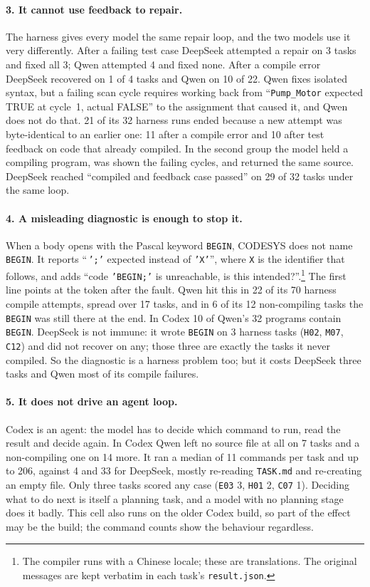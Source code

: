 \paragraph{3. It cannot use feedback to repair.}
The harness gives every model the same repair loop, and the two models use it
very differently. After a failing test case DeepSeek attempted a repair on 3
tasks and fixed all 3; Qwen attempted 4 and fixed none. After a compile error
DeepSeek recovered on 1 of 4 tasks and Qwen on 10 of 22. Qwen fixes isolated
syntax, but a failing scan cycle requires working back from ``\texttt{Pump\_Motor}
expected TRUE at cycle~1, actual FALSE'' to the assignment that caused it, and
Qwen does not do that. 21 of its 32 harness runs ended because a new attempt was
byte-identical to an earlier one: 11 after a compile error and 10 after test
feedback on code that already compiled. In the second group the model held a
compiling program, was shown the failing cycles, and returned the same source.
DeepSeek reached ``compiled and feedback case passed'' on 29 of 32 tasks under
the same loop.

\paragraph{4. A misleading diagnostic is enough to stop it.}
When a body opens with the Pascal keyword \texttt{BEGIN}, CODESYS does not name
\texttt{BEGIN}. It reports ``\,\texttt{';'} expected instead of
\texttt{'X'}'', where \texttt{X} is the identifier that follows, and adds
``code \texttt{'BEGIN;'} is unreachable, is this intended?''.\footnote{The
compiler runs with a Chinese locale; these are translations. The original
messages are kept verbatim in each task's \texttt{result.json}.} The first line
points at the token after the fault. Qwen hit this in 22 of its 70 harness
compile attempts, spread over 17 tasks, and in 6 of its 12 non-compiling tasks
the \texttt{BEGIN} was still there at the end. In Codex 10 of Qwen's 32 programs
contain \texttt{BEGIN}. DeepSeek is not immune: it wrote \texttt{BEGIN} on 3
harness tasks (\texttt{H02}, \texttt{M07}, \texttt{C12}) and did not recover on
any; those three are exactly the tasks it never compiled. So the diagnostic
is a harness problem too; but it costs DeepSeek three tasks and Qwen most of its
compile failures.

\paragraph{5. It does not drive an agent loop.}
Codex is an agent: the model has to decide which command to run, read the
result and decide again. In Codex Qwen left no source file at all on 7 tasks and
a non-compiling one on 14 more. It ran a median of 11 commands per task and up
to 206, against 4 and 33 for DeepSeek, mostly re-reading \texttt{TASK.md} and
re-creating an empty file. Only three tasks scored any case (\texttt{E03} 3,
\texttt{H01} 2, \texttt{C07} 1). Deciding what to do next is itself a planning
task, and a model with no planning stage does it badly. This cell also runs on
the older Codex build, so part of the effect may be the build; the command
counts show the behaviour regardless.

